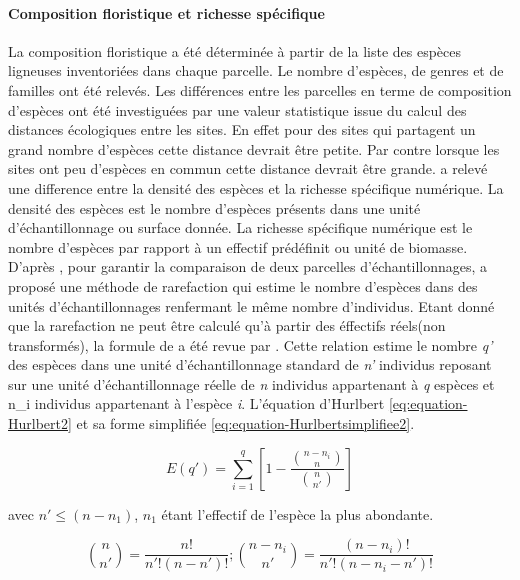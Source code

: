 \documentclass[
  12pt,
  a4paper,
  extrafontsizes,
  onecolumn,
  openright]{book}
\theoremstyle{definition}
\theoremstyle{definition}
\theoremstyle{definition}
\theoremstyle{definition}
\theoremstyle{remark}
\begin{document}
\hypertarget{composition-floristique-et-richesse-spuxe9cifique}{%
\paragraph{Composition floristique et richesse spécifique}\label{composition-floristique-et-richesse-spuxe9cifique}}

La composition floristique a été déterminée à partir de la liste des espèces ligneuses inventoriées dans chaque parcelle. Le nombre d'espèces, de genres et de familles ont été relevés. Les différences entre les parcelles en terme de composition d'espèces ont été investiguées par une valeur statistique issue du calcul des distances écologiques entre les sites. En effet pour des sites qui partagent un grand nombre d'espèces cette distance devrait être petite. Par contre lorsque les sites ont peu d'espèces en commun cette distance devrait être grande. \citet{Magurran2004} a relevé une difference entre la densité des espèces et la richesse spécifique numérique. La densité des espèces est le nombre d'espèces présents dans une unité d'échantillonnage ou surface donnée\citep{Hurlbert1971}. La richesse spécifique numérique est le nombre d'espèces par rapport à un effectif prédéfinit ou unité de biomasse\citep{Kempton1979}. D'après \citet{Borcard2018}, pour garantir la comparaison de deux parcelles d'échantillonnages, \citet{Sanders1968} a proposé une méthode de rarefaction qui estime le nombre d'espèces dans des unités d'échantillonnages renfermant le même nombre d'individus. Etant donné que la rarefaction ne peut être calculé qu'à partir des éffectifs réels(non transformés), la formule de \citet{Sanders1968} a été revue par \citet{Hurlbert1971}. Cette relation estime le nombre \emph{q'} des espèces dans une unité d'échantillonnage standard de \emph{n'} individus reposant sur une unité d'échantillonnage réelle de \emph{n} individus appartenant à \emph{q} espèces et n\_i individus appartenant à l'espèce \emph{i}. L'équation d'Hurlbert \eqref{eq:equation-Hurlbert2} et sa forme simplifiée \eqref{eq:equation-Hurlbertsimplifiee2}.

\begin{equation}
E(q')=\sum_{i=1}^q\left[1-\frac{\binom{n-n_i}{n}}{\binom{n}{n'}}\right]
\label{eq:equation-Hurlbert2}
\end{equation}

avec \(n'\le(n-n_1)\), \(n_1\) étant l'effectif de l'espèce la plus abondante.

\begin{equation}
\binom {n}{n'}=\frac{n!}{n'!(n-n')!};\binom{n-n_i}{n'}=\frac{(n-n_i)!}{n'!(n-n_i-n')!}
\label{eq:equation-Hurlbertsimplifiee2}
\end{equation}
\end{document}
